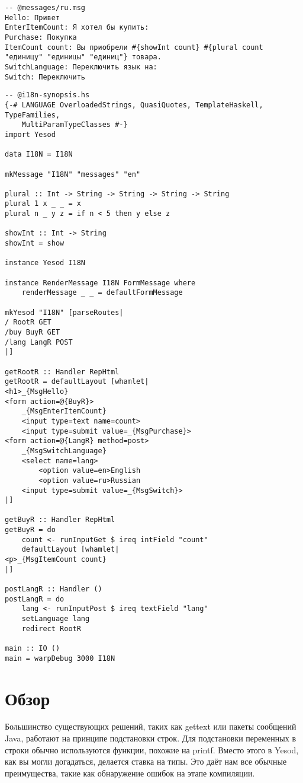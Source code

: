 \begin{lstlisting}
-- @messages/ru.msg
Hello: Привет
EnterItemCount: Я хотел бы купить: 
Purchase: Покупка
ItemCount count: Вы приобрели #{showInt count} #{plural count "единицу" "единицы" "единиц"} товара.
SwitchLanguage: Переключить язык на:
Switch: Переключить
\end{lstlisting}

\begin{lstlisting}
-- @i18n-synopsis.hs
{-# LANGUAGE OverloadedStrings, QuasiQuotes, TemplateHaskell, TypeFamilies,
    MultiParamTypeClasses #-}
import Yesod

data I18N = I18N

mkMessage "I18N" "messages" "en"

plural :: Int -> String -> String -> String -> String
plural 1 x _ _ = x
plural n _ y z = if n < 5 then y else z

showInt :: Int -> String
showInt = show

instance Yesod I18N

instance RenderMessage I18N FormMessage where
    renderMessage _ _ = defaultFormMessage

mkYesod "I18N" [parseRoutes|
/ RootR GET
/buy BuyR GET
/lang LangR POST
|]

getRootR :: Handler RepHtml
getRootR = defaultLayout [whamlet|
<h1>_{MsgHello}
<form action=@{BuyR}>
    _{MsgEnterItemCount}
    <input type=text name=count>
    <input type=submit value=_{MsgPurchase}>
<form action=@{LangR} method=post>
    _{MsgSwitchLanguage}
    <select name=lang>
        <option value=en>English
        <option value=ru>Russian
    <input type=submit value=_{MsgSwitch}>
|]

getBuyR :: Handler RepHtml
getBuyR = do
    count <- runInputGet $ ireq intField "count"
    defaultLayout [whamlet|
<p>_{MsgItemCount count}
|]

postLangR :: Handler ()
postLangR = do
    lang <- runInputPost $ ireq textField "lang"
    setLanguage lang
    redirect RootR

main :: IO ()
main = warpDebug 3000 I18N
\end{lstlisting}

\section{Обзор} %

Большинство существующих решений, таких как gettext или пакеты сообщений Java, работают на принципе подстановки строк. Для подстановки переменных в строки обычно используются функции, похожие на printf. Вместо этого в Yesod, как вы могли догадаться, делается ставка на типы. Это даёт нам все обычные преимущества, такие как обнаружение ошибок на этапе компиляции.

